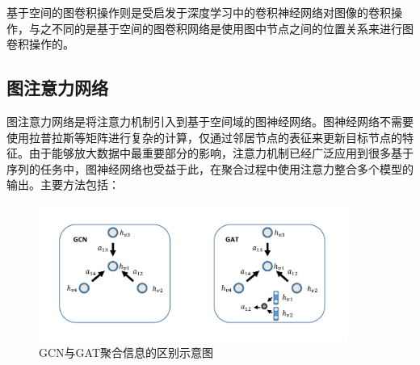 基于空间的图卷积操作则是受启发于深度学习中的卷积神经网络对图像的卷积操作，与之不同的是基于空间的图卷积网络是使用图中节点之间的位置关系来进行图卷积操作的。

\subsection{图注意力网络}

图注意力网络是将注意力机制引入到基于空间域的图神经网络。图神经网络不需要使用拉普拉斯等矩阵进行复杂的计算，仅通过邻居节点的表征来更新目标节点的特征。由于能够放大数据中最重要部分的影响，注意力机制已经广泛应用到很多基于序列的任务中，图神经网络也受益于此，在聚合过程中使用注意力整合多个模型的输出。主要方法包括：
\begin{figure}[htb]
    \includegraphics[width=0.9\textwidth]{fig/gcn-gat.pdf}
    \caption{GCN与GAT聚合信息的区别示意图}
    \label{fig:GCN-GAT}
  \end{figure}
